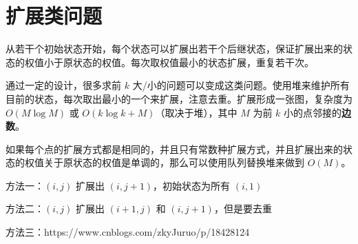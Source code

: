 \section{扩展类问题}
    从若干个初始状态开始，每个状态可以扩展出若干个后继状态，保证扩展出来的状态的权值小于原状态的权值。每次取权值最小的状态扩展，重复若干次。

    通过一定的设计，很多求前 $k$ 大/小的问题可以变成这类问题。使用堆来维护所有目前的状态，每次取出最小的一个来扩展，注意去重。扩展形成一张图，复杂度为 $O(M\log M)$ 或 $O(k\log k+M)$（取决于堆），其中 $M$ 为前 $k$ 小的点邻接的\textbf{边数}。

    如果每个点的扩展方式都是相同的，并且只有常数种扩展方式，并且扩展出来的状态的权值关于原状态的权值是单调的，那么可以使用队列替换堆来做到 $O(M)$。
\begin{example}[序列合并]

\end{example}
\begin{solution}
        方法一：$(i,j)$ 扩展出 $(i,j+1)$，初始状态为所有 $(i,1)$

    方法二：$(i,j)$ 扩展出 $(i+1,j)$ 和 $(i,j+1)$，但是要去重

    方法三：https://www.cnblogs.com/zkyJuruo/p/18428124
\end{solution}

